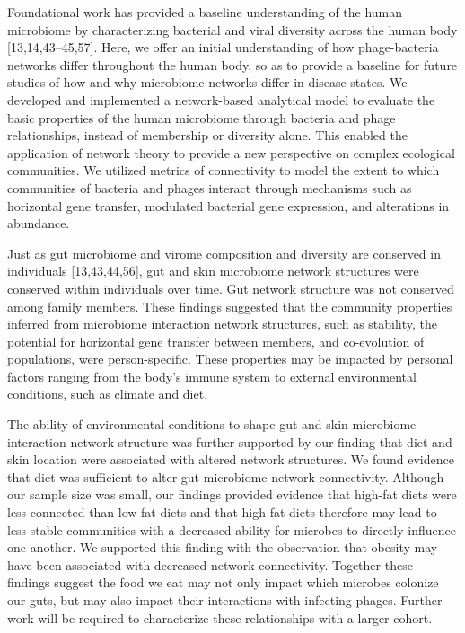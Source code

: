 \documentclass[12pt,]{article}
\begin{document}
Foundational work has provided a baseline understanding of the human
microbiome by characterizing bacterial and viral diversity across the
human body {[}13,14,43--45,57{]}. Here, we offer an initial
understanding of how phage-bacteria networks differ throughout the human
body, so as to provide a baseline for future studies of how and why
microbiome networks differ in disease states. We developed and
implemented a network-based analytical model to evaluate the basic
properties of the human microbiome through bacteria and phage
relationships, instead of membership or diversity alone. This enabled
the application of network theory to provide a new perspective on
complex ecological communities. We utilized metrics of connectivity to
model the extent to which communities of bacteria and phages interact
through mechanisms such as horizontal gene transfer, modulated bacterial
gene expression, and alterations in abundance.

Just as gut microbiome and virome composition and diversity are
conserved in individuals {[}13,43,44,56{]}, gut and skin microbiome
network structures were conserved within individuals over time. Gut
network structure was not conserved among family members. These findings
suggested that the community properties inferred from microbiome
interaction network structures, such as stability, the potential for
horizontal gene transfer between members, and co-evolution of
populations, were person-specific. These properties may be impacted by
personal factors ranging from the body's immune system to external
environmental conditions, such as climate and diet.

The ability of environmental conditions to shape gut and skin microbiome
interaction network structure was further supported by our finding that
diet and skin location were associated with altered network structures.
We found evidence that diet was sufficient to alter gut microbiome
network connectivity. Although our sample size was small, our findings
provided evidence that high-fat diets were less connected than low-fat
diets and that high-fat diets therefore may lead to less stable
communities with a decreased ability for microbes to directly influence
one another. We supported this finding with the observation that obesity
may have been associated with decreased network connectivity. Together
these findings suggest the food we eat may not only impact which
microbes colonize our guts, but may also impact their interactions with
infecting phages. Further work will be required to characterize these
relationships with a larger cohort.
\end{document}
